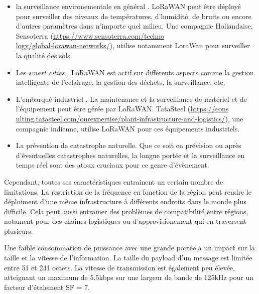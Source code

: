 \begin{itemize}

\item la surveillance environementale en général \cite{lorauc1}. LoRaWAN peut être déployé pour surveiller des niveaux de températures, d'humidité, de bruits ou encore d'autres paramètres dans n'importe quel milieu. Une compagnie Hollandaise, Sensoterra (\href{https://www.sensoterra.com/technology/global-lorawan-networks/}{https://www.sensoterra.com/techno \\ logy/global-lorawan-networks/}), utilise notamment LoraWan pour surveiller la qualité des sols.
\item Les \textit{smart cities} \cite{lorauc2}. LoRaWAN est actif sur différents aspects comme la gestion intelligente de l'éclairage, la gestion des déchets, la surveillance, etc.
\item L'embarqué industriel \cite{lorauc3}. La maintenance et la surveillance de matériel et de l'équipement peut être gérée par LoRaWAN. TataSteel (\href{https://consulting.tatasteel.com/our_expertise/plant-infrastructure-and-logistics/}{https://cons \\ ulting.tatasteel.com/ourexpertise/plant-infrastructure-and-logistics/}), une compagnie indienne, utilise LoRaWAN pour ces équipements industriels.
\item La prévention de catastrophe naturelle. Que ce soit en prévision\cite{lorauc41} ou après\cite{lorauc43} d'éventuelles catastrophes naturelles, la longue portée et la surveillance en temps réel sont des atoux cruciaux pour ce genre d'évènement.
\end{itemize}

\vspace{0.1cm}

Cependant, toutes ses caractéristiques entrainent un certain nombre de limitations. La restriction de la fréquence en fonction de la région peut rendre le déploiment d'une même infrastructure à différents endroits dans le monde plus difficile. Cela peut aussi entrainer des problèmes de compatibilité entre régions, notament pour des chaines logistiques ou d'approvisionement qui en traversent plusieurs.

\vspace{0.1cm}

Une faible consommation de puissance avec une grande portée a un impact sur la taille et la vitesse de l'information. La taille du payload d'un message est limitée entre 51 et 241 octets. La vitesse de transmission est également peu élevée, atteignant un maximum de 5.5kbps sur une largeur de bande de 125kHz pour un facteur d'étalement SF = 7.

